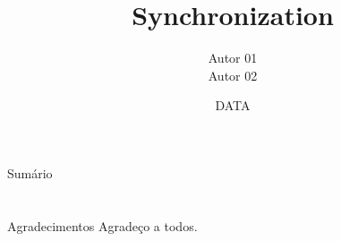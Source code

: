 \documentclass{beamer}
\title[SUBTÍTULO]{
	Synchronization}
\date{
	DATA}
\author[AUTOR]{
	Autor 01 \inst{1}\\
	\vspace{0.25cm}
	Autor 02 \inst{2}}
\institute[INSTITUTO]{
	\inst{1}%
	\url{usuario@mail.com}\\
	\vspace{0.25cm}
	\inst{2}%
	Departamento\\
	Universidade}
\begin{document}
\frame{\titlepage}
\section[]{}
\begin{frame}{Sumário}
	\tableofcontents
\end{frame}











\section{}
\begin{frame}{Agradecimentos}
	Agradeço a todos. 	
\end{frame}
\end{document}
